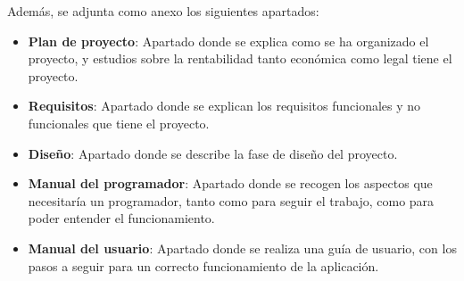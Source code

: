 Además, se adjunta como anexo los siguientes apartados:
\begin{itemize}
    \item \textbf{Plan de proyecto}: Apartado donde se explica como se ha organizado el proyecto, y estudios sobre la rentabilidad tanto económica como legal tiene el proyecto.
    \item \textbf{Requisitos}: Apartado donde se explican los requisitos funcionales y no funcionales que tiene el proyecto.
    \item \textbf{Diseño}: Apartado donde se describe la fase de diseño del proyecto.
    \item \textbf{Manual del programador}: Apartado donde se recogen los aspectos que necesitaría un programador, tanto como para seguir el trabajo, como para poder entender el funcionamiento.
    \item \textbf{Manual del usuario}: Apartado donde se realiza una guía de usuario, con los pasos a seguir para un correcto funcionamiento de la aplicación.
\end{itemize}